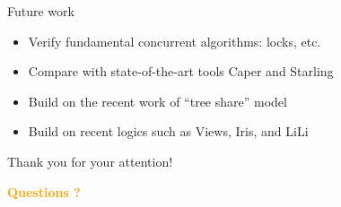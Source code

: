 \documentclass[11pt]{beamer}
\newcommand\orange[1]{\textcolor{orange}{\textbf{#1}}}
\begin{document}
\begin{frame}{Future work}
  \begin{itemize}
  \item Verify fundamental concurrent algorithms: locks, etc.
  \item Compare with state-of-the-art tools Caper and Starling
    \item Build on the recent work of ``tree share'' model
  \item Build on recent logics such as Views, Iris, and LiLi
  \end{itemize}
\end{frame}

\begin{frame}{Thank you for your attention!}
  \begin{center}
    \Large \orange{Questions ?}
  \end{center}
\end{frame}
\end{document}
